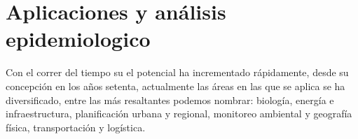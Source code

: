 \section{Aplicaciones y análisis epidemiologico}
\label{sec:cap2-aplicaciones-analisis-epidemiologico}

Con el correr del tiempo su el potencial ha incrementado rápidamente, desde su concepción en los años setenta,
actualmente las áreas en las que se aplica se ha diversificado, entre las más resaltantes podemos nombrar:
biología, energía e infraestructura, planificación urbana y regional, monitoreo ambiental y geografía física,
transportación y logística.
